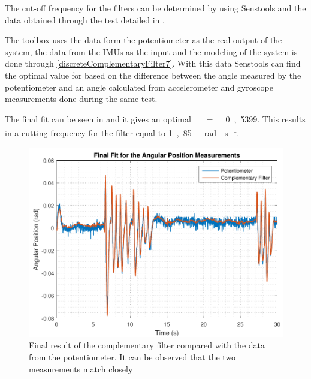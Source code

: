 The cut-off frequency for the filters can be determined by using Senstools and the data obtained through the test detailed in .

The toolbox uses the data form the potentiometer as the real output of the system, the data from the IMUs as the input and the modeling of the system is done through \eqref{discreteComplementaryFilter7}. With this data Senstools can find the optimal value for \si{\tau} based on the difference between the angle measured by the potentiometer and an angle calculated from accelerometer and gyroscope measurements done during the same test.

The final fit can be seen in  and it gives an optimal \si{\tau\ =\ 0,5399}. This results in a cutting frequency for the filter equal to \si{1,85\ rad \cdot s^{-1}}.

%
\begin{figure}[H]
	\centering
	\includegraphics[scale=0.65]{figures/filterSensTool}
	\caption{Final result of the complementary filter compared with the data from the potentiometer. It can be observed that the two measurements match closely}
	\label{filterSensTool}
\end{figure}\vspace{-5mm}
%
